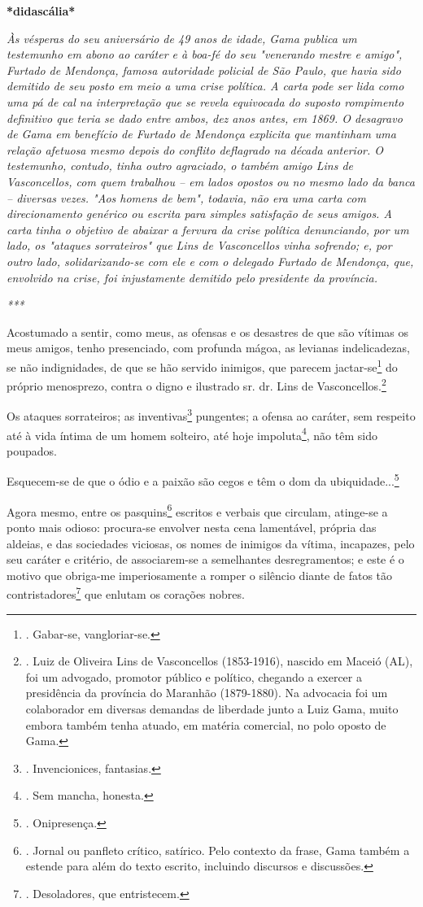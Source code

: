 \textbf{*didascália*}

\emph{Às vésperas do seu aniversário de 49 anos de idade, Gama publica
um testemunho em abono ao caráter e à boa-fé do seu "venerando mestre e
amigo", Furtado de Mendonça, famosa autoridade policial de São Paulo,
que havia sido demitido de seu posto em meio a uma crise política. A
carta pode ser lida como uma pá de cal na interpretação que se revela
equivocada do suposto rompimento definitivo que teria se dado entre
ambos, dez anos antes, em 1869. O desagravo de Gama em benefício de
Furtado de Mendonça explicita que mantinham uma relação afetuosa mesmo
depois do conflito deflagrado na década anterior. O testemunho, contudo,
tinha outro agraciado, o também amigo Lins de Vasconcellos, com quem
trabalhou -- em lados opostos ou no mesmo lado da banca -- diversas
vezes. "Aos homens de bem", todavia, não era uma carta com
direcionamento genérico ou escrita para simples satisfação de seus
amigos. A carta tinha o objetivo de abaixar a fervura da crise política
denunciando, por um lado, os "ataques sorrateiros" que Lins de
Vasconcellos vinha sofrendo; e, por outro lado, solidarizando-se com ele
e com o delegado Furtado de Mendonça, que, envolvido na crise, foi
injustamente demitido pelo presidente da província. }

\emph{***}

Acostumado a sentir, como meus, as ofensas e os desastres de que são
vítimas os meus amigos, tenho presenciado, com profunda mágoa, as
levianas indelicadezas, se não indignidades, de que se hão servido
inimigos, que parecem jactar-se\footnote{. Gabar-se, vangloriar-se.} do
próprio menosprezo, contra o digno e ilustrado sr. dr. Lins de
Vasconcellos.\footnote{. Luiz de Oliveira Lins de Vasconcellos
  (1853-1916), nascido em Maceió (AL), foi um advogado, promotor público
  e político, chegando a exercer a presidência da província do Maranhão
  (1879-1880). Na advocacia foi um colaborador em diversas demandas de
  liberdade junto a Luiz Gama, muito embora também tenha atuado, em
  matéria comercial, no polo oposto de Gama.}

Os ataques sorrateiros; as inventivas\footnote{. Invencionices,
  fantasias.} pungentes; a ofensa ao caráter, sem respeito até à vida
íntima de um homem solteiro, até hoje impoluta\footnote{. Sem mancha,
  honesta.}, não têm sido poupados.

Esquecem-se de que o ódio e a paixão são cegos e têm o dom da
ubiquidade...\footnote{. Onipresença.}

Agora mesmo, entre os pasquins\footnote{. Jornal ou panfleto crítico,
  satírico. Pelo contexto da frase, Gama também a estende para além do
  texto escrito, incluindo discursos e discussões.} escritos e verbais
que circulam, atinge-se a ponto mais odioso: procura-se envolver nesta
cena lamentável, própria das aldeias, e das sociedades viciosas, os
nomes de inimigos da vítima, incapazes, pelo seu caráter e critério, de
associarem-se a semelhantes desregramentos; e este é o motivo que
obriga-me imperiosamente a romper o silêncio diante de fatos tão
contristadores\footnote{. Desoladores, que entristecem.} que enlutam os
corações nobres.


